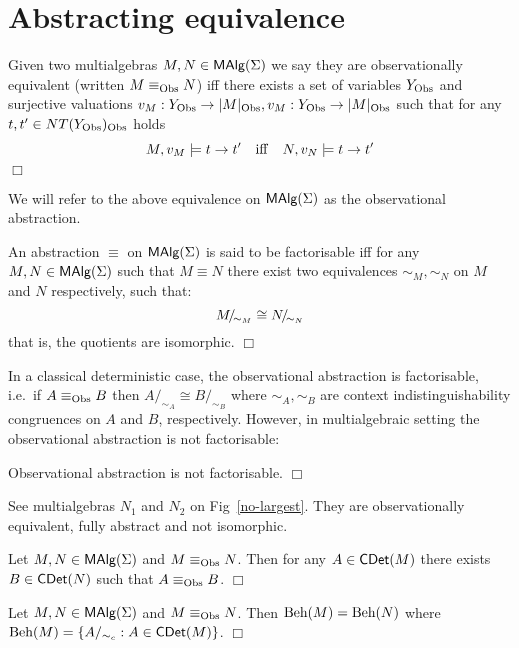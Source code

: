 \section{Abstracting equivalence}

\begin{Definition} 
Given two multialgebras $M,N \in \mbox{\rm\sf MAlg}(\Sigma)$ we say they are
observationally equivalent (written $M \equiv_{\rm Obs} N$) iff there exists a set
of variables $Y_{\rm Obs}$ and surjective valuations $v_M: Y_{\rm Obs} \rightarrow
|M|_{\rm Obs}, v_M: Y_{\rm Obs} \rightarrow |M|_{\rm Obs}$ such that for any $t,t' \in
NT(Y_{\rm Obs})_{\rm Obs}$ holds
\[
M,v_M \models t \rightarrow t' \quad {\rm iff} \quad N,v_N \models t \rightarrow t'
\]
\hfill$\Box$
\end{Definition}
%
We will refer to the above equivalence on $\mbox{\rm\sf MAlg}(\Sigma)$ as the
observational abstraction. 

\begin{Definition}
An abstraction $\equiv$ on $\mbox{\rm\sf MAlg}(\Sigma)$ is said to be factorisable
iff for any $M,N \in \mbox{\rm\sf MAlg}(\Sigma)$ such that $M \equiv N$ there exist
two equivalences $\sim_M, \sim_N$ on $M$ and $N$ respectively, such
that:
\[
M\!{\textstyle /}\!_{\sim_M} \cong N\!{\textstyle /}\!_{\sim_N}
\]
that is, the quotients are isomorphic.
\hfill$\Box$
\end{Definition}

In a classical deterministic case, the observational abstraction is
factorisable, i.e.\ if $A \equiv_{\rm Obs} B$ then $A/_{\sim_A} \cong B/_{\sim_B}$
where $\sim_A, \sim_B$ are context indistinguishability congruences on
$A$ and $B$, respectively. However, in multialgebraic setting the
observational abstraction is not factorisable:

\begin{Lemma}
Observational abstraction is not factorisable.
\hfill$\Box$
\end{Lemma}  

\begin{Proof}
See multialgebras $N_1$ and $N_2$ on Fig~\ref{no-largest}. They are
observationally equivalent, fully abstract and not isomorphic.
\end{Proof}

\begin{Lemma}
Let $M,N \in \mbox{\rm\sf MAlg}(\Sigma)$ and $M \equiv_{\rm Obs} N$. Then for any $A \in
\mbox{\sf CDet}(M)$ there exists $B \in \mbox{\sf CDet}(N)$ such that $A \equiv_{\rm Obs} B$.
\hfill$\Box$
\end{Lemma}

\begin{Corollary}
Let $M,N \in \mbox{\rm\sf MAlg}(\Sigma)$ and $M \equiv_{\rm Obs} N$. Then $\mbox{Beh}(M) = \mbox{Beh}(N)$
where $\mbox{Beh}(M) = \{A/_{\sim_c} : A \in \mbox{\sf CDet}(M)\}$.
\hfill$\Box$
\end{Corollary}

